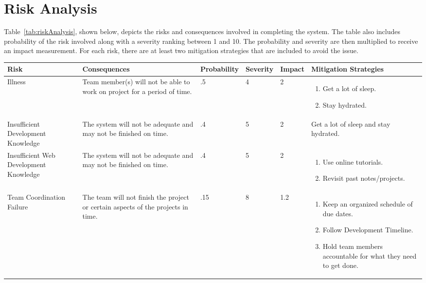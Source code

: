 \chapter{Risk Analysis}

Table~\ref{tab:riskAnalysis}, shown below, depicts the risks and consequences involved in completing the system. The table also includes probability of the risk involved along with a severity ranking between 1 and 10. The probability and severity are then multiplied to receive an impact measurement. For each risk, there are at least two mitigation strategies that are included to avoid the issue. 

\begin{table}
\centering
\begin{tabular}{|p{7em}|p{7em}|p{5em}|p{4em}|p{4em}|p{11em}|}
\hline
\textbf{Risk} & \textbf{Consequences} & \textbf{Probability} & \textbf{Severity} & \textbf{Impact} & \textbf{Mitigation Strategies} \\
\hline
Illness & Team member(s) will not be able to work on project for a period of time. & .5 & 4 & 2 & \begin{enumerate}
	\item Get a lot of sleep.
	\item Stay hydrated.
\end{enumerate} \\
\hline
Insufficient Development Knowledge & The system will not be adequate and may not be finished on time. & .4 & 5 & 2 & Get a lot of sleep and stay hydrated. \\
\hline
Insufficient Web Development Knowledge & The system will not be adequate and may not be finished on time. & .4 & 5 & 2 & 
\begin{enumerate}
	\item Use online tutorials.
	\item Revisit past notes/projects.
\end{enumerate} \\
\hline
Team Coordination Failure & The team will not finish the project or certain aspects of the projects in time. & .15 & 8 & 1.2 & 
\begin{enumerate}
	\item Keep an organized schedule of due dates.
	\item Follow Development Timeline.
	\item Hold team members accountable for what they need to get done.
\end{enumerate} \\

\end{tabular}
\end{table}
